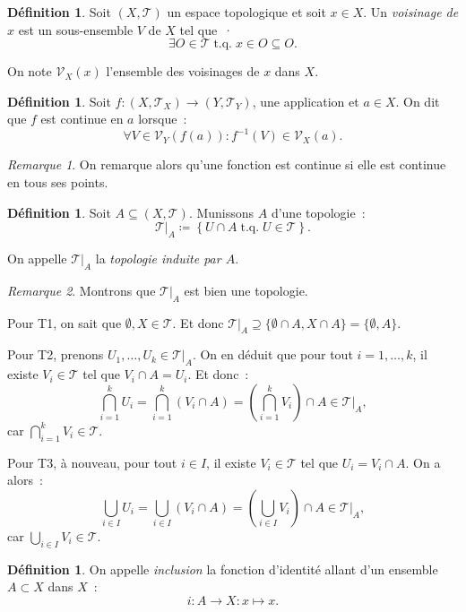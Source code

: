 \documentclass{report}
\theoremstyle{definition}
\newtheorem{déf}[thm]{Définition}
\theoremstyle{remark}
\newtheorem*{rmq}{Remarque}
\DeclareMathOperator{\tq}{\text{ t.q. }}
\newcommand{\restr}[2]{\left.#1\right|_{#2}}
\renewcommand{\top}{\mathcal T}
\begin{document}
		\begin{déf} Soit $(X, \top)$ un espace topologique et soit $x \in X$. Un \textit{voisinage de $x$} est un sous-ensemble $V$ de $X$ tel que~·
		\[\exists O \in \top \tq x \in O \subseteq O.\]

		On note $\mathcal V_X(x)$ l'ensemble des voisinages de $x$ dans $X$.
		\end{déf}

		\begin{déf} Soit $f : (X, \top_X) \to (Y, \top_Y)$, une application et $a \in X$. On dit que $f$ est continue en $a$ lorsque~:
		\[\forall V \in \mathcal V_Y(f(a)) : f^{-1}(V) \in \mathcal V_X(a).\]
		\end{déf}

		\begin{rmq} On remarque alors qu'une fonction est continue si elle est continue en tous ses points.
		\end{rmq}

		\begin{déf} Soit $A \subseteq (X, \top)$. Munissons $A$ d'une topologie~:
		\[\restr \top A \coloneqq \left\{U \cap A \tq U \in \top\right\}.\]

		On appelle $\restr \top A$ la \textit{topologie induite par $A$}.
		\end{déf}

		\begin{rmq} Montrons que $\restr \top A$ est bien une topologie.

		Pour T1, on sait que $\emptyset, X \in \top$. Et donc $\restr \top A \supseteq \{\emptyset \cap A, X \cap A\} = \{\emptyset, A\}$.

		Pour T2, prenons $U_1, \ldots, U_k \in \restr \top A$. On en déduit que pour tout $i = 1, \ldots, k$, il existe $V_i \in \top$ tel que $V_i \cap A = U_i$.
		Et donc~:
		\[\bigcap_{i=1}^kU_i = \bigcap_{i=1}^k(V_i \cap A) = \left(\bigcap_{i=1}^kV_i\right) \cap A \in \restr \top A,\]
		car $\bigcap_{i=1}^kV_i \in \top$.

		Pour T3, à nouveau, pour tout $i \in I$, il existe $V_i \in \top$ tel que $U_i = V_i \cap A$. On a alors~:
		\[\bigcup_{i \in I}U_i = \bigcup_{i \in I}(V_i \cap A) = \left(\bigcup_{i \in I}V_i\right) \cap A \in \restr \top A,\]
		car $\bigcup_{i\in I}V_i \in \top$.
		\end{rmq}

		\begin{déf} On appelle \textit{inclusion} la fonction d'identité allant d'un ensemble $A \subset X$ dans $X$~:
		\[i : A \to X : x \mapsto x.\]
		\end{déf}
\end{document}
